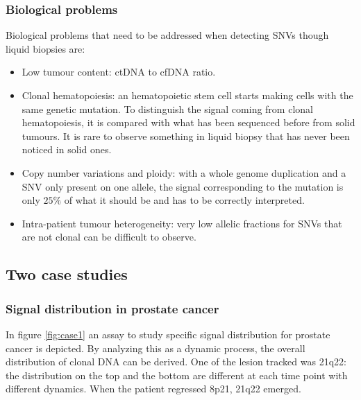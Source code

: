         \subsubsection{Biological problems}
        Biological problems that need to be addressed when detecting SNVs though liquid biopsies are:

        \begin{multicols}{2}
            \begin{itemize}
                \item Low tumour content: ctDNA to cfDNA ratio.
                \item Clonal hematopoiesis: an hematopoietic stem cell starts making cells with the same genetic mutation.
                    To distinguish the signal coming from clonal hematopoiesis, it is compared with what has been sequenced before from solid tumours.
                    It is rare to observe something in liquid biopsy that has never been noticed in solid ones.
                \item Copy number variations and ploidy: with a whole genome duplication and a SNV only present on one allele, the signal corresponding to the mutation is only $25\%$ of what it should be and has to be correctly interpreted.
                \item Intra-patient tumour heterogeneity: very low allelic fractions for SNVs that are not clonal can be difficult to observe.
            \end{itemize}
        \end{multicols}


    \subsection{Two case studies}

        \subsubsection{Signal distribution in prostate cancer}
        In figure \ref{fig:case1} an assay to study specific signal distribution for prostate cancer is depicted.
        By analyzing this as a dynamic process, the overall distribution of clonal DNA can be derived.
        One of the lesion tracked was 21q22: the distribution on the top and the bottom are different at each time point with different dynamics.
        When the patient regressed 8p21, 21q22 emerged.

